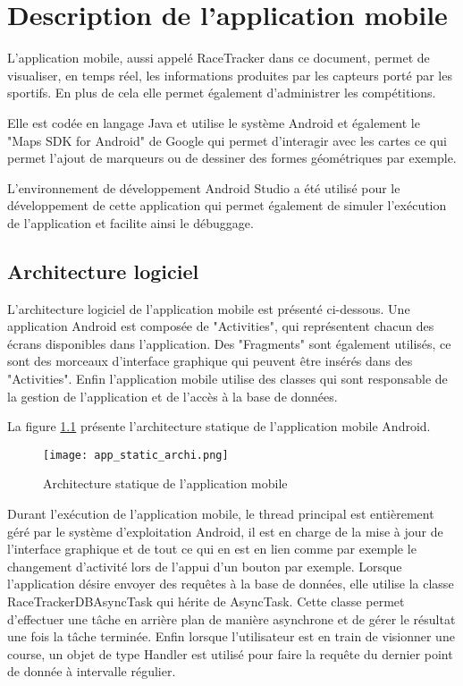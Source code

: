 
\chapter{Description de l'application mobile}\label{ch:app_mobile}

L'application mobile, aussi appelé RaceTracker dans ce document, permet de visualiser, en temps réel, les informations produites par les capteurs porté par les sportifs. En plus de cela elle permet également d'administrer les compétitions.

Elle est codée en langage Java et utilise le système Android et également le "Maps SDK for Android" de Google qui permet d'interagir avec les cartes ce qui permet l'ajout de marqueurs ou de dessiner des formes géométriques par exemple.

L'environnement de développement Android Studio a été utilisé pour le développement de cette application qui permet également de simuler l'exécution de l'application et facilite ainsi le débuggage.


\section{Architecture logiciel}

L'architecture logiciel de l'application mobile est présenté ci-dessous. Une application Android est composée de "Activities", qui représentent chacun des écrans disponibles dans l'application. Des "Fragments" sont également utilisés, ce sont des morceaux d'interface graphique qui peuvent être insérés dans des "Activities". Enfin l'application mobile utilise des classes qui sont responsable de la gestion de l'application et de l'accès à la base de données.

La figure \ref{fig:app_static_archi} présente l'architecture statique de l'application mobile Android.

\begin{figure}[htb]
\centering 
\texttt{[image: app\_static\_archi.png]} 
\caption{Architecture statique de l'application mobile}
\label{fig:app_static_archi}
\end{figure}

Durant l'exécution de l'application mobile, le thread principal est entièrement géré par le système d'exploitation Android, il est en charge de la mise à jour de l'interface graphique et de tout ce qui en est en lien comme par exemple le changement d'activité lors de l'appui d'un bouton par exemple. Lorsque l'application désire envoyer des requêtes à la base de données, elle utilise la classe RaceTrackerDBAsyncTask qui hérite de AsyncTask. Cette classe permet d'effectuer une tâche en arrière plan de manière asynchrone et de gérer le résultat une fois la tâche terminée. Enfin lorsque l'utilisateur est en train de visionner une course, un objet de type Handler est utilisé pour faire la requête du dernier point de donnée à intervalle régulier.

